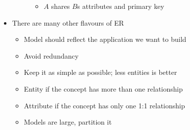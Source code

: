 \begin{itemize}
\begin{description}
\begin{itemize}
                    \item $A$ shares $B$s attributes and primary key
                \end{itemize}
        \end{description}
    \item There are many other flavours of ER
        \begin{itemize}
            \item Model should reflect the application we want to build
            \item Avoid redundancy
            \item Keep it as simple as possible; less entities is better
            \item Entity if the concept has more than one relationship
            \item Attribute if the concept has only one 1:1 relationship
            \item Models are large, partition it
        \end{itemize}
\end{itemize}

